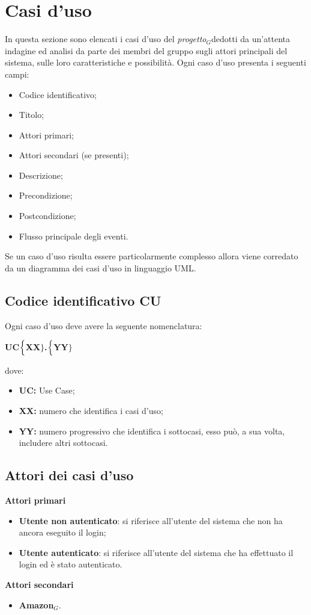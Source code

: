 \chapter{Casi d'uso}
\label{UC}
In questa sezione sono elencati i casi d'uso del \textit{progetto$_{G}$}dedotti da un'attenta indagine ed analisi da parte dei membri del gruppo sugli attori principali del sistema, sulle loro caratteristiche e possibilità.
Ogni caso d'uso presenta i seguenti campi:
\begin{itemize}
	\item Codice identificativo;
	\item Titolo;
	\item Attori primari;
	\item Attori secondari (se presenti);
	\item Descrizione;
	\item Precondizione;
	\item Postcondizione;
	\item Flusso principale degli eventi.
\end{itemize}
Se un caso d'uso risulta essere particolarmente complesso allora viene corredato da un diagramma dei casi d'uso in linguaggio UML.
\section{Codice identificativo CU}
Ogni caso d'uso deve avere la seguente nomenclatura:
\begin{center}
	\textbf{UC$\Bigl\{$XX$\Bigr\}$.$\Bigl\{$YY$\Bigr\}$}
\end{center}
dove:
\begin{itemize}
	\item \textbf{UC:} Use Case;
	\item \textbf{{XX}:} numero che identifica i casi d'uso;
	\item \textbf{{YY}:} numero progressivo che identifica i sottocasi, esso può, a sua volta, includere altri sottocasi.
\end{itemize}

\section{Attori dei casi d'uso}
\textbf{Attori primari}
\begin{itemize}
	\item \textbf{Utente non autenticato}: si riferisce all'utente del sistema che non ha ancora eseguito il login;
	\item \textbf{Utente autenticato}: si riferisce all'utente del sistema che ha effettuato il login ed è stato autenticato.
\end{itemize}
\textbf{Attori secondari}
\begin{itemize}
	\item \textbf{Amazon$_{G}$}.
\end{itemize}

